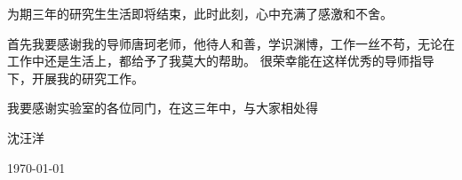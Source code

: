 ﻿
\begin{thanks}
为期三年的研究生生活即将结束，此时此刻，心中充满了感激和不舍。

首先我要感谢我的导师唐珂老师，他待人和善，学识渊博，工作一丝不苟，无论在工作中还是生活上，都给予了我莫大的帮助。
很荣幸能在这样优秀的导师指导下，开展我的研究工作。

我要感谢实验室的各位同门，在这三年中，与大家相处得
\begin{flushright}
沈汪洋

\today
\end{flushright}

\end{thanks}
